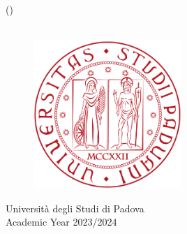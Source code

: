 
\newcommand{\condBreak}[1]{\ifx#1\empty\else \\ \fi }

\begin{titlepage}
	\begin{center}
		\vspace*{1.0in}
		{\huge \bf \projTitle}
		\vspace{.3in}
		
		{\Large{\projAuthorNames}} \\
		{\large{(\projAuthorOneRollno)}} \\
		{\large{\projAuthorGroup}}\\
		
		\vspace{1.0in}
		
		\begin{figure}[!ht]
			\centering
			\includegraphics[width=0.5\textwidth]{images/unipd_logo.png}
		\end{figure}
		
		\vspace{1.9in}
		
		{Università degli Studi di Padova}\\
		{Academic Year 2023/2024}
		
		
	\end{center}
\end{titlepage}